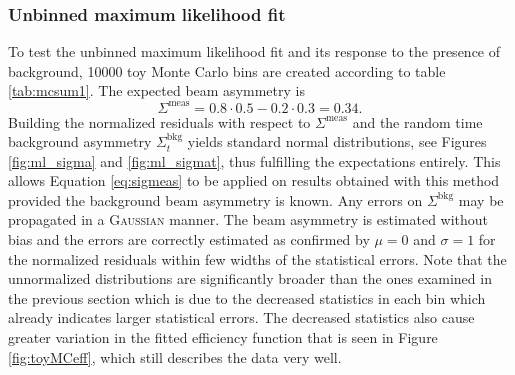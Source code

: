 \subsubsection{Unbinned maximum likelihood fit}
To test the unbinned maximum likelihood fit and its response to the presence of background, 10000 toy Monte Carlo bins are created according to table \ref{tab:mcsum1}. The expected beam asymmetry is \begin{equation}
	\Sigma^\text{meas}=0.8\cdot0.5-0.2\cdot0.3=0.34.
\end{equation} 
Building the normalized residuals with respect to $\Sigma^\text{meas}$ and the random time background asymmetry $\Sigma^\text{bkg}_t$ yields standard normal distributions, see Figures \ref{fig:ml_sigma} and \ref{fig:ml_sigmat}, thus fulfilling the expectations entirely. This allows Equation \eqref{eq:sigmeas} to be applied on results obtained with this method provided the background beam asymmetry is known. Any errors on $\Sigma^\text{bkg}$ may be propagated in a \textsc{Gaussian} manner. The beam asymmetry is estimated without bias and the errors are correctly estimated as confirmed by $\mu=0$ and $\sigma=1$ for the normalized residuals within few widths of the statistical errors. Note that the unnormalized distributions are significantly broader than the ones examined in the previous section which is due to the decreased statistics in each bin which already indicates larger statistical errors. The decreased statistics also cause greater variation in the fitted efficiency function that is seen in Figure \ref{fig:toyMCeff}, which still describes the data very well.
